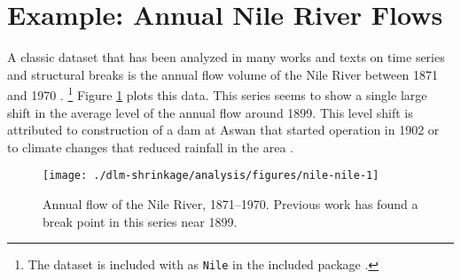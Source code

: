 


\section{Example: Annual Nile River Flows}
\label{dlm:sec:nile}

A classic dataset that has been analyzed in many works and texts on time series and structural breaks is the annual flow volume of the Nile River between 1871 and 1970 \parencites{Cobb1978}{Balke1993}{DeJongPenzer1998}{}{DurbinKoopman2012}{CommandeurKoopmanOoms2011}.%
\footnote{The dataset is included with \RLang{} as \texttt{Nile} in the included package .}
Figure \ref{dlm:fig:nile} plots this data.
This series seems to show a single large shift in the average level of the annual flow around 1899.
This level shift is attributed to construction of a dam at Aswan that started operation in 1902 or to climate changes that reduced rainfall in the area \parencite[278]{Cobb1978}.

\begin{figure}
  \centering
  \texttt{[image: ./dlm-shrinkage/analysis/figures/nile-nile-1]}
  \caption[Annual flow of the Nile River, 1871--1970]{Annual flow of the Nile River, 1871--1970. Previous work has found a break point in this series near 1899.}
  \label{dlm:fig:nile}
\end{figure}

